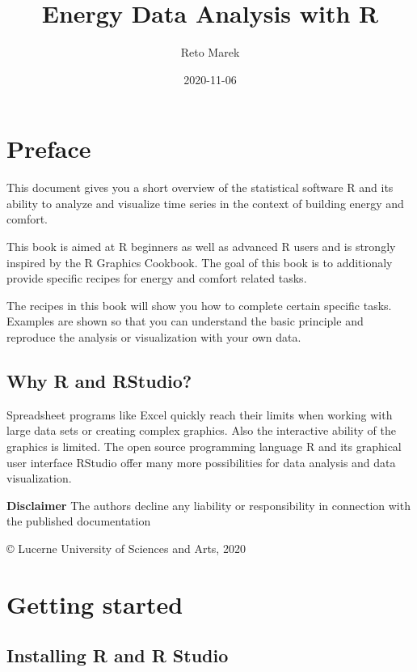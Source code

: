 \documentclass[
]{book}
\title{Energy Data Analysis with R}
\author{Reto Marek}
\date{2020-11-06}
\begin{document}
\maketitle

{
\setcounter{tocdepth}{1}
\tableofcontents
}
\hypertarget{preface}{%
\chapter*{Preface}\label{preface}}

This document gives you a short overview of the statistical software R and its ability to analyze and visualize time series in the context of building energy and comfort.

This book is aimed at R beginners as well as advanced R users and is strongly inspired by the R Graphics Cookbook. The goal of this book is to additionaly provide specific recipes for energy and comfort related tasks.

The recipes in this book will show you how to complete certain specific tasks. Examples are shown so that you can understand the basic principle and reproduce the analysis or visualization with your own data.

\hypertarget{why-r-and-rstudio}{%
\section{Why R and RStudio?}\label{why-r-and-rstudio}}

Spreadsheet programs like Excel quickly reach their limits when working with large data sets or creating complex graphics. Also the interactive ability of the graphics is limited. The open source programming language R and its graphical user interface RStudio offer many more possibilities for data analysis and data visualization.

\textbf{Disclaimer}
The authors decline any liability or responsibility in connection with the published documentation

© Lucerne University of Sciences and Arts, 2020

\hypertarget{getting-started}{%
\chapter{Getting started}\label{getting-started}}

\hypertarget{installation}{%
\section{Installing R and R Studio}\label{installation}}
\end{document}
